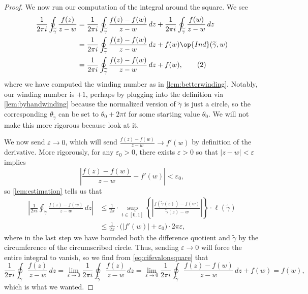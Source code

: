 \documentclass[../notes.tex]{subfiles}
\begin{document}
\begin{proof}
	We now run our computation of the integral around the square. We see
	\begin{align*}
		\frac1{2\pi i}\oint_{\widetilde\gamma}\frac{f(z)}{z-w} &= \frac1{2\pi i}\oint_{\widetilde\gamma}\frac{f(z)-f(w)}{z-w}\,dz+\frac1{2\pi i}\oint_{\widetilde\gamma}\frac{f(w)}{z-w}\,dz \\
		&= \frac1{2\pi i}\oint_{\widetilde\gamma}\frac{f(z)-f(w)}{z-w}\,dz+f(w)\op{Ind}(\widetilde\gamma,w) \\
		&= \frac1{2\pi i}\oint_{\widetilde\gamma}\frac{f(z)-f(w)}{z-w}\,dz+f(w), \tag{2}\label{eq:cifevalonsquare}
	\end{align*}
	where we have computed the winding number as in \autoref{lem:betterwinding}. Notably, our winding number is $+1$, perhaps by plugging into the definition via \autoref{lem:byhandwinding} because the normalized version of $\widetilde\gamma$ is just a circle, so the corresponding $\theta_{\widetilde\gamma}$ can be set to $\theta_0+2\pi t$ for some starting value $\theta_0$. We will not make this more rigorous because look at it.

	We now send $\varepsilon\to0$, which will send $\frac{f(z)-f(w)}{z-w}\to f'(w)$ by definition of the derivative. More rigorously, for any $\varepsilon_0>0$, there exists $\varepsilon>0$ so that $|z-w|<\varepsilon$ implies
	\[\left|\frac{f(z)-f(w)}{z-w}-f'(w)\right|<\varepsilon_0,\]
	so \autoref{lem:estimation} tells us that
	\begin{align*}
		\left|\frac1{2\pi i}\oint_{\widetilde\gamma}\frac{f(z)-f(w)}{z-w}\,dz\right| &\le \frac1{2\pi}\cdot\sup_{t\in[0,1]}\left\{\left|\frac{f(\widetilde\gamma(z))-f(w)}{\widetilde\gamma(z)-w}\right|\right\}\cdot\ell(\widetilde\gamma) \\
		&\le \frac1{2\pi}\cdot\big(|f'(w)|+\varepsilon_0\big)\cdot2\pi\varepsilon,
	\end{align*}
	where in the last step we have bounded both the difference quotient and $\widetilde\gamma$ by the circumference of the circumscribed circle. Thus, sending $\varepsilon\to0$ will force the entire integral to vanish, so we find from \autoref{eq:cifevalonsquare} that
	\[\frac1{2\pi i}\oint_\gamma\frac{f(z)}{z-w}\,dz=\lim_{\varepsilon\to0}\frac1{2\pi i}\oint_{\widetilde\gamma}\frac{f(z)}{z-w}\,dz=\lim_{\varepsilon\to0}\frac1{2\pi i}\oint_{\widetilde\gamma}\frac{f(z)-f(w)}{z-w}\,dz+f(w)=f(w),\]
	which is what we wanted.
\end{proof}
\end{document}

